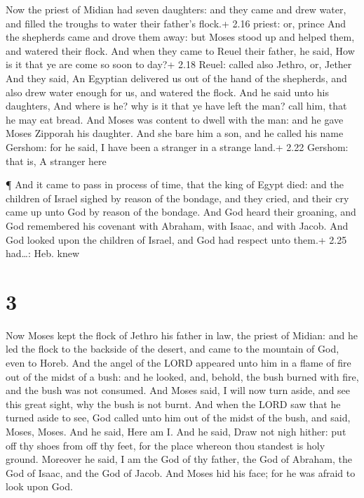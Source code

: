  Now the priest of Midian had seven daughters: and they
came and drew water, and filled the troughs to water their father's
flock.+ 2.16 priest: or, prince  And the shepherds came and
drove them away: but Moses stood up and helped them, and watered their
flock.  And when they came to Reuel their father, he said,
How is it that ye are come so soon to day?+ 2.18 Reuel: called also
Jethro, or, Jether  And they said, An Egyptian delivered us
out of the hand of the shepherds, and also drew water enough for us, and
watered the flock.  And he said unto his daughters, And
where is he? why is it that ye have left the man? call him, that he may
eat bread.  And Moses was content to dwell with the man:
and he gave Moses Zipporah his daughter.  And she bare him
a son, and he called his name Gershom: for he said, I have been a
stranger in a strange land.+ 2.22 Gershom: that is, A stranger here

 ¶ And it came to pass in process of time, that the king of
Egypt died: and the children of Israel sighed by reason of the bondage,
and they cried, and their cry came up unto God by reason of the bondage.
 And God heard their groaning, and God remembered his
covenant with Abraham, with Isaac, and with Jacob.  And God
looked upon the children of Israel, and God had respect unto them.+ 2.25
had\ldots: Heb. knew

\hypertarget{section-2}{%
\section{3}\label{section-2}}

 Now Moses kept the flock of Jethro his father in law, the
priest of Midian: and he led the flock to the backside of the desert,
and came to the mountain of God, even to Horeb.  And the
angel of the LORD appeared unto him in a flame of fire out of the midst
of a bush: and he looked, and, behold, the bush burned with fire, and
the bush was not consumed.  And Moses said, I will now turn
aside, and see this great sight, why the bush is not burnt. 
And when the LORD saw that he turned aside to see, God called unto him
out of the midst of the bush, and said, Moses, Moses. And he said, Here
am I.  And he said, Draw not nigh hither: put off thy shoes
from off thy feet, for the place whereon thou standest is holy ground.
 Moreover he said, I am the God of thy father, the God of
Abraham, the God of Isaac, and the God of Jacob. And Moses hid his face;
for he was afraid to look upon God.

